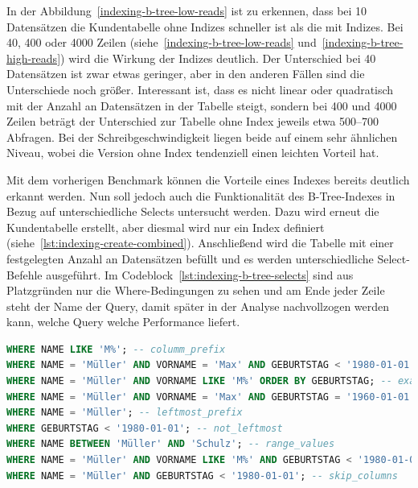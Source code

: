 In der Abbildung~\ref{indexing-b-tree-low-reads} ist zu erkennen, dass bei 10 Datensätzen die Kundentabelle ohne Indizes schneller ist als die mit Indizes.
Bei 40, 400 oder 4000 Zeilen (siehe~\ref{indexing-b-tree-low-reads} und~\ref{indexing-b-tree-high-reads}) wird die Wirkung der Indizes deutlich.
Der Unterschied bei 40 Datensätzen ist zwar etwas geringer, aber in den anderen Fällen sind die Unterschiede noch größer.
Interessant ist, dass es nicht linear oder quadratisch mit der Anzahl an Datensätzen in der Tabelle steigt, sondern bei 400 und 4000 Zeilen beträgt der Unterschied zur Tabelle ohne Index jeweils etwa 500--700 Abfragen.
Bei der Schreibgeschwindigkeit liegen beide auf einem sehr ähnlichen Niveau, wobei die Version ohne Index tendenziell einen leichten Vorteil hat.

Mit dem vorherigen Benchmark können die Vorteile eines Indexes bereits deutlich erkannt werden.
Nun soll jedoch auch die Funktionalität des B-Tree-Indexes in Bezug auf unterschiedliche Selects untersucht werden.
Dazu wird erneut die Kundentabelle erstellt, aber diesmal wird nur ein Index definiert (siehe~\ref{lst:indexing-create-combined}).
Anschließend wird die Tabelle mit einer festgelegten Anzahl an Datensätzen befüllt und es werden unterschiedliche Select-Befehle ausgeführt.
Im Codeblock~\ref{lst:indexing-b-tree-selects} sind aus Platzgründen nur die Where-Bedingungen zu sehen und am Ende jeder Zeile steht der Name der Query, damit später in der Analyse nachvollzogen werden kann, welche Query welche Performance liefert.

\vspace{-5pt}
\begin{lstlisting}[language=SQL,caption=Unterschiedliche Where-Bedingungen für B-Tree-Index,label={lst:indexing-b-tree-selects},basicstyle=\ttfamily\scriptsize]
WHERE NAME LIKE 'M%'; -- columm_prefix
WHERE NAME = 'Müller' AND VORNAME = 'Max' AND GEBURTSTAG < '1980-01-01'; -- combined_match_with_range
WHERE NAME = 'Müller' AND VORNAME LIKE 'M%' ORDER BY GEBURTSTAG; -- exact_with_prefix
WHERE NAME = 'Müller' AND VORNAME = 'Max' AND GEBURTSTAG = '1960-01-01'; -- full_match
WHERE NAME = 'Müller'; -- leftmost_prefix
WHERE GEBURTSTAG < '1980-01-01'; -- not_leftmost
WHERE NAME BETWEEN 'Müller' AND 'Schulz'; -- range_values
WHERE NAME = 'Müller' AND VORNAME LIKE 'M%' AND GEBURTSTAG < '1980-01-01'; -- range_with_like
WHERE NAME = 'Müller' AND GEBURTSTAG < '1980-01-01'; -- skip_columns
\end{lstlisting}
\vspace{-5pt}

